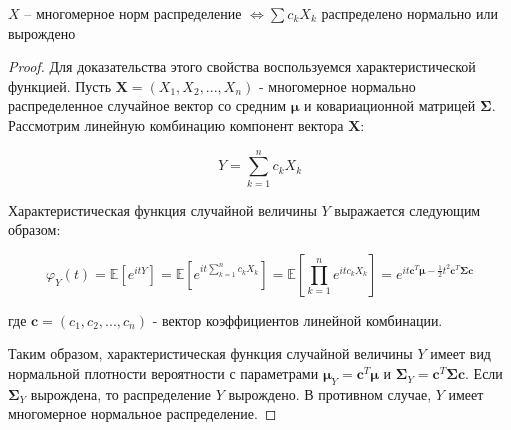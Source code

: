 \documentclass{article}
\begin{document}
    \begin{remark}
        $X$ -- многомерное норм распределение $\Leftrightarrow \sum c_k X_k$ распределено нормально или вырождено
        \begin{proof}
            Для доказательства этого свойства воспользуемся характеристической функцией. Пусть $\boldsymbol{X} = (X_1, X_2, ..., X_n)$ - многомерное нормально распределенное случайное вектор со средним $\boldsymbol{\mu}$ и ковариационной матрицей $\boldsymbol{\Sigma}$. Рассмотрим линейную комбинацию компонент вектора $\boldsymbol{X}$:

            $$Y = \sum_{k=1}^{n}c_kX_k$$
            
            Характеристическая функция случайной величины $Y$ выражается следующим образом:
            
            $$\varphi_Y(t) = \mathbb{E}[e^{itY}] = \mathbb{E}\left[e^{it\sum_{k=1}^{n}c_kX_k}\right] = \mathbb{E}\left[\prod_{k=1}^{n}e^{itc_kX_k}\right] = e^{it\boldsymbol{c}^T\boldsymbol{\mu} - \frac{1}{2}t^2\boldsymbol{c}^T\boldsymbol{\Sigma}\boldsymbol{c}}$$
            
            где $\boldsymbol{c} = (c_1, c_2, ..., c_n)$ - вектор коэффициентов линейной комбинации.
            
            Таким образом, характеристическая функция случайной величины $Y$ имеет вид нормальной плотности вероятности с параметрами $\boldsymbol{\mu}_Y = \boldsymbol{c}^T\boldsymbol{\mu}$ и $\boldsymbol{\Sigma}_Y = \boldsymbol{c}^T\boldsymbol{\Sigma}\boldsymbol{c}$. Если $\boldsymbol{\Sigma}_Y$ вырождена, то распределение $Y$ вырождено. В противном случае, $Y$ имеет многомерное нормальное распределение.
        \end{proof}
    \end{remark}
\end{document}
